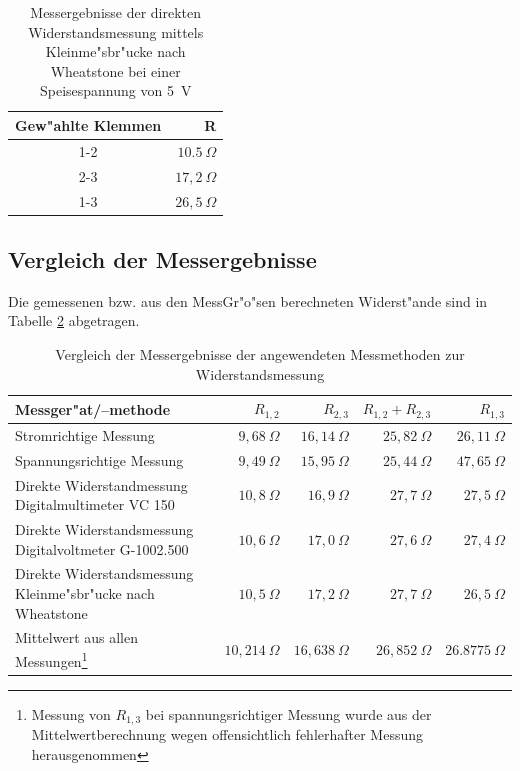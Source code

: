 \documentclass[10pt]{scrartcl}
\begin{document}
\begin{table}
\begin{minipage}[t]{\textwidth}
\begin{center}
\begin{tabular}{|cr|}
\hline
    Gew"ahlte Klemmen & R %
    \\
\hline
    1-2 & $10.5~\Omega$\\
    2-3 & $17,2~\Omega$\\
    1-3 & $26,5~\Omega$\\
\hline
\end{tabular}
\end{center}
\end{minipage}
\caption{Messergebnisse der direkten Widerstandsmessung mittels Kleinme"sbr"ucke nach Wheatstone bei einer Speisespannung von 5~V}
\label{table:5}
\end{table}

\subsection{Vergleich der Messergebnisse}

Die gemessenen bzw. aus den MessGr"o"sen berechneten Widerst"ande sind in Tabelle \ref{table:6} abgetragen.

\begin{table}
\begin{minipage}[t]{\textwidth}
\begin{center}
\begin{tabularx}{\textwidth}{|Xrrrr|}
\hline
    Messger"at/--methode & $R_{1, 2}$  & $R_{2, 3}$ & $R_{1, 2}+R_{2, 3}$ & $R_{1, 3}$ \\
\hline
    Stromrichtige Messung & $9,68~\Omega$ & $16,14~\Omega$ &  $25,82~\Omega$ & $26,11~\Omega$ \\
    Spannungsrichtige Messung & $9,49~\Omega$ & $15,95~\Omega$ & $25,44~\Omega$ & $47,65~\Omega$ \\
    Direkte Widerstandmessung Digitalmultimeter VC 150 & $10,8~\Omega$ & $16,9~\Omega$ & $27,7~\Omega$ & $27,5~\Omega$ \\
    Direkte Widerstandsmessung Digitalvoltmeter G-1002.500 & $10,6~\Omega$ & $17,0~\Omega$ & $27,6~\Omega$ & $27,4~\Omega$ \\
    Direkte Widerstandsmessung Kleinme"sbr"ucke nach Wheatstone & $10,5~\Omega$ & $17,2~\Omega$ & $27,7~\Omega$ & $26,5~\Omega$ \\
    Mittelwert aus allen Messungen\footnote{Messung von $R_{1,3}$ bei spannungsrichtiger Messung wurde aus der Mittelwertberechnung wegen offensichtlich fehlerhafter Messung herausgenommen} & $10,214~\Omega$ & $16,638~\Omega$ & $26,852~\Omega$ & $26.8775~\Omega$ \\
\hline
\end{tabularx}
\end{center}
\end{minipage}
\caption{Vergleich der Messergebnisse der angewendeten Messmethoden zur Widerstandsmessung}
\label{table:6}
\end{table}
\end{document}
